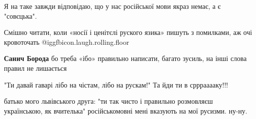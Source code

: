  
Я на таке завжди відповідаю, що у нас російської мови якраз немає, а є "совєцька".

 
Смішно читати, коли «носії і ценітєлі руского язика» пишуть з помилками, аж очі кровоточать  @igg{fbicon.laugh.rolling.floor} 

\begin{itemize}
 
\textbf{Санич Борода} бо треба «ібо» правильно написати, багато зусиль, на інші слова правил не лишається
\end{itemize}

 
"Ти давай гаварі лібо на чістам, лібо на рускам!"
Та йди ти в срррааааку!!!

 
батько мого львівського друга: "ти так чисто і правильно розмовляєш українською, як вчителька"
російськомовні мені вказують на мої русизми. ну-ну.

 
